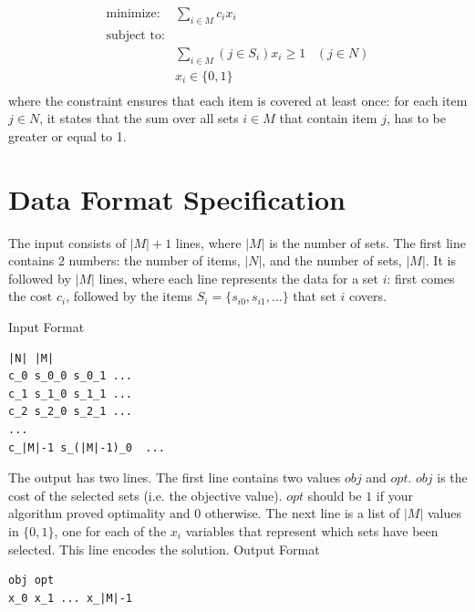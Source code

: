 \documentclass[11pt]{article}
\begin{document}

$$
\begin{array}{ll}
\mbox{minimize:} & \displaystyle \sum_{i \in M} c_i x_i \\
\mbox{subject to:} & \\
     & \displaystyle \sum_{i \in M} (j \in S_i)x_i \geq 1 \;\;\; (j \in N)\\
     & x_i \in \{0,1\}\\
\end{array}
$$
%
where the constraint ensures that each item is covered at least once: for each item $j \in N$, 
it states that the sum over all sets $i \in M$ that contain item $j$, has to be greater or 
equal to 1. 

\section{Data Format Specification}

The input consists of $|M|+1$ lines, where $|M|$ is the number of sets. 
The first line contains 2 numbers: the number of items, $|N|$, and the number of 
sets, $|M|$. It is followed by $|M|$ lines, where each line represents 
the data for a set $i$: first comes the cost $c_i$, followed by the
items  $S_i = \{ s_{i0}, s_{i1}, \dots \}$ that set $i$ covers.

\vspace{0.2cm}
\noindent
Input Format
\vspace{-0.2cm}
\begin{Verbatim}[frame=single]
|N| |M|
c_0 s_0_0 s_0_1 ...
c_1 s_1_0 s_1_1 ...
c_2 s_2_0 s_2_1 ...
...
c_|M|-1 s_(|M|-1)_0  ...
\end{Verbatim}
%
%
The output has two lines.  The first line contains two values $obj$ and $opt$.  $obj$ is the cost of the selected sets (i.e. the objective value).  $opt$ should be $1$ if your algorithm proved optimality and $0$ otherwise.  The next line is a list of $|M|$ values in $\{0,1\}$, one for each of the $x_i$ variables that represent which sets have been selected.  This line encodes the solution.
\vspace{0.2cm}
\noindent
Output Format
\vspace{-0.2cm}
\begin{Verbatim}[frame=single]
obj opt
x_0 x_1 ... x_|M|-1
\end{Verbatim}
%
\end{document}
